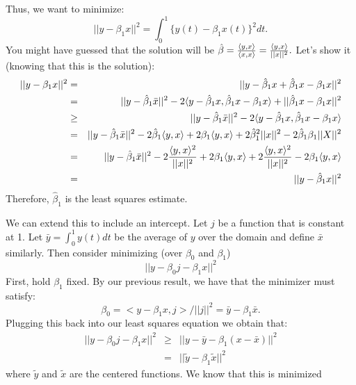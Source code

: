 Thus, we want to minimize:
$$
|| y - \beta_1 x ||^2 = 
\int_0^1 \{y(t) - \beta_1 x(t)\}^2 dt.
$$
You might have guessed that the solution will be $\hat \beta = \frac{\langle y, x \rangle}{\langle x, x \rangle} = \frac{\langle y, x \rangle}{||x||^2}.$
Let's show it (knowing that this is the solution):
\begin{eqnarray*}
|| y - \beta_1 x ||^2 & = & 
|| y - \hat \beta_1 x + \hat \beta_1 x  - \beta_1 x ||^2 \\
& = & || y - \hat \beta_1 \bar x ||^2
- 2 \ip{ y - \hat \beta_1 x }{\hat \beta_1 x - \beta_1 x}
+ ||\hat \beta_1 x - \beta_1 x||^2 \\
& \geq & 
|| y - \hat \beta_1 \bar x ||^2
- 2 \ip{ y - \hat \beta_1 x}{\hat \beta_1 x - \beta_1 x}\\
& = & || y - \hat \beta_1 \bar x ||^2
- 2 \hat \beta_1 \ip{y}{x} + 2 \beta_1 \ip{y}{x} + 2
\hat \beta_1^2 ||x||^2 - 2 \hat \beta_1 \beta_1 ||X||^2 \\
& = & || y - \hat \beta_1 \bar x ||^2 %
-  2 \frac{\ip{y}{x}^2}{||x||^2} + 2 \beta_1 \ip{y}{x} %
+ 2 \frac{\ip{y}{x}^2}{||x||^2} %
- 2 \beta_1 \ip{y}{x} \\
& = & || y - \hat \beta_1  x ||^2
\end{eqnarray*}
Therefore, $\hat \beta_1$ is the least squares estimate.

We can extend this to include an intercept. Let $j$ be a function
that is constant at 1. 
Let $\bar y = \int_0^1 y(t)dt$ be the average of $y$ over
the domain and define $\bar x$ similarly.
Then consider minimizing (over $\beta_0$ and $\beta_1$)
$$
|| y - \beta_0 j - \beta_1 x ||^2
$$
First, hold $\beta_1$ fixed. By our previous result, we
have that the minimizer must satisfy:
$$
\beta_0 = <y - \beta_1 x, j> / ||j||^2 = 
\bar y - \beta_1 \bar x.
$$
Plugging this back into our least squares equation we
obtain that:
\begin{eqnarray*}
|| y - \beta_0 j - \beta_1 x ||^2 & \geq &
|| y - \bar y - \beta_1 (x - \bar x)||^2 \\
& = & || \tilde y - \beta_1 \tilde x||^2
\end{eqnarray*}
where $\tilde y$ and $\tilde x$ are the centered functions.  
We know that this is minimized


